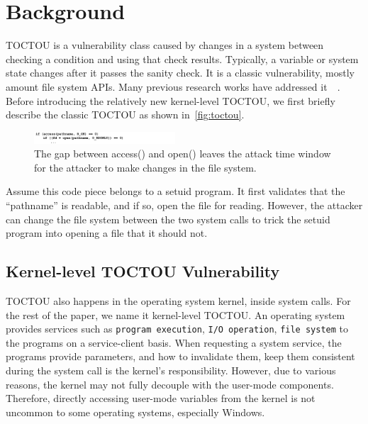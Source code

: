
\section{Background}
\label{sec:background}


TOCTOU is a vulnerability class caused by changes in a system between checking a condition and using that check results. Typically, a variable or system state changes after it passes the sanity check. It is a classic vulnerability, mostly amount file system APIs. Many previous research works have addressed it~\cite{dean2004fixing}~\cite{borisov2005fixing}. Before introducing the relatively new kernel-level TOCTOU, we first briefly describe the classic TOCTOU as shown in~\autoref{fig:toctou}.


\begin{figure}[th]
	\includegraphics[width=0.47\textwidth]{figures/toctou}
	\centering
	\caption{The gap between access() and open() leaves the attack time window for the attacker to make changes in the file system.}
	\label{fig:toctou}
\end{figure}




Assume this code piece belongs to a setuid program. It first validates that the ``pathname'' is readable, and if so, open the file for reading. However, the attacker can change the file system between the two system calls to trick the setuid program into opening a file that it should not.



\subsection{Kernel-level TOCTOU Vulnerability}


TOCTOU also happens in the operating system kernel, inside system calls. For the rest of the paper, we name it kernel-level TOCTOU. An operating system provides services such as \texttt{program execution}, \texttt{I/O operation}, \texttt{file system} to the programs on a service-client basis. When requesting a system service, the programs provide parameters, and how to invalidate them, keep them consistent during the system call is the kernel's responsibility. However, due to various reasons, the kernel may not fully decouple with the user-mode components. Therefore, directly accessing user-mode variables from the kernel is not uncommon to some operating systems, especially Windows.

